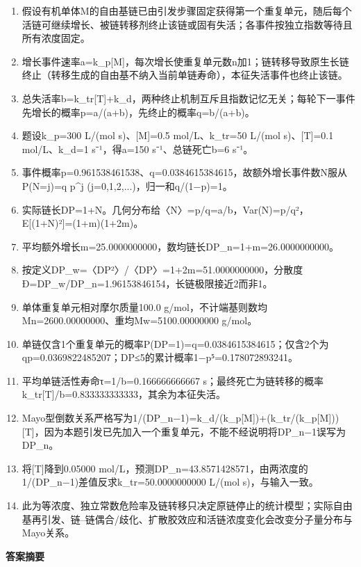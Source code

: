 \documentclass[UTF8,11pt,a4paper]{ctexart}
\begin{document}
\begin{enumerate}
\item 假设有机单体M的自由基链已由引发步骤固定获得第一个重复单元，随后每个活链可继续增长、被链转移剂终止该链或固有失活；各事件按独立指数等待且所有浓度固定。
\item 增长事件速率a=k\_p[M]，每次增长使重复单元数n加1；链转移导致原生长链终止（转移生成的自由基不纳入当前单链寿命），本征失活事件也终止该链。
\item 总失活率b=k\_tr[T]+k\_d，两种终止机制互斥且指数记忆无关；每轮下一事件先增长的概率p=a/(a+b)，先终止的概率q=b/(a+b)。
\item 题设k\_p=300 L/(mol s)、[M]=0.5 mol/L、k\_tr=50 L/(mol s)、[T]=0.1 mol/L、k\_d=1 s⁻¹，得a=150 s⁻¹、总链死亡b=6 s⁻¹。
\item 事件概率p=0.961538461538、q=0.0384615384615，故额外增长事件数N服从P(N=j)=q p\textasciicircum{}j (j=0,1,2,...)，归一和q/(1−p)=1。
\item 实际链长DP=1+N。几何分布给〈N〉=p/q=a/b，Var(N)=p/q²，E[(1+N)²]=(1+m)(1+2m)。
\item 平均额外增长m=25.0000000000，数均链长DP\_n=1+m=26.0000000000。
\item 按定义DP\_w=〈DP²〉/〈DP〉=1+2m=51.0000000000，分散度Đ=DP\_w/DP\_n=1.96153846154，长链极限接近2而非1。
\item 单体重复单元相对摩尔质量100.0 g/mol，不计端基则数均Mn=2600.00000000、重均Mw=5100.00000000 g/mol。
\item 单链仅含1个重复单元的概率P(DP=1)=q=0.0384615384615；仅含2个为qp=0.0369822485207；DP≤5的累计概率1−p⁵=0.178072893241。
\item 平均单链活性寿命τ=1/b=0.166666666667 s；最终死亡为链转移的概率k\_tr[T]/b=0.833333333333，其余为本征失活。
\item Mayo型倒数关系严格写为1/(DP\_n−1)=k\_d/(k\_p[M])+(k\_tr/(k\_p[M]))[T]，因为本题引发已先加入一个重复单元，不能不经说明将DP\_n−1误写为DP\_n。
\item 将[T]降到0.05000 mol/L，预测DP\_n=43.8571428571，由两浓度的1/(DP\_n−1)差值反求k\_tr=50.0000000000 L/(mol s)，与输入一致。
\item 此为等浓度、独立常数危险率及链转移只决定原链停止的统计模型；实际自由基再引发、链–链偶合/歧化、扩散胶效应和活链浓度变化会改变分子量分布与Mayo关系。
\end{enumerate}
\noindent\textbf{答案摘要}\par
\end{document}
